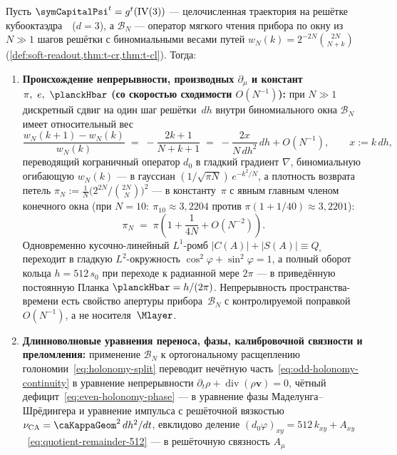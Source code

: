 \begin{theorem}
\label{thm:continuum-emergence-from-z}
\label{thm:continuum-emergence-ym-mass-gap}
Пусть $\symCapitalPsi^t = g^t(\mathrm{IV}(3))$ --- целочисленная траектория на решётке кубооктаэдра~\latGCKshort\ ($d=3$),
а $\mathcal{B}_N$ --- оператор мягкого чтения прибора по окну из $N\gg 1$ шагов решётки с биномиальными весами путей
$w_N(k) = 2^{-2N}\binom{2N}{N+k}$ (\cref{def:soft-readout,thm:t-cr,thm:t-cl}). Тогда:
\begin{enumerate}[label=(\roman*)]
\item \textbf{Происхождение непрерывности, производных $\partial_\mu$ и констант $\pi,\ e,\ \planckHbar$ (со скоростью сходимости $O(N^{-1})$):}
  при $N\gg 1$ дискретный сдвиг на один шаг решётки~$dh$ внутри биномиального окна $\mathcal{B}_N$ имеет относительный вес
  \[
    \frac{w_N(k+1) - w_N(k)}{w_N(k)} \;=\; -\frac{2k+1}{N+k+1} \;=\; -\frac{2x}{N\,dh^2}\,dh + O(N^{-1}),
    \qquad x := k\,dh,
  \]
  переводящий кограничный оператор $d_0$ в гладкий градиент $\nabla$, биномиальную огибающую $w_N(k)$ --- в гауссиан
  $(1/\sqrt{\pi N})\,e^{-k^2/N}$, а плотность возврата петель $\pi_N := \frac{1}{N}\bigl(2^{2N}/\binom{2N}{N}\bigr)^2$ --- в константу~$\pi$
  с явным главным членом конечного окна (при $N=10\colon\ \pi_{10}\approx 3{,}2204$ против $\pi(1+1/40)\approx 3{,}2201$):
  \[
    \pi_N \;=\; \pi\left(1 + \frac{1}{4N} + O(N^{-2})\right).
  \]
  Одновременно кусочно-линейный $L^1$-ромб $|C(A)|+|S(A)|\equiv Q_\square$ переходит в гладкую $L^2$-окружность $\cos^2\varphi + \sin^2\varphi = 1$,
  а полный оборот кольца $h = 512\,s_0$ при переходе к радианной мере $2\pi$ --- в приведённую постоянную Планка $\planckHbar = h/(2\pi)$.
  Непрерывность пространства-времени есть свойство апертуры прибора~$\mathcal{B}_N$ с контролируемой поправкой $O(N^{-1})$, а не носителя~$\Mlayer$.
\item \textbf{Длинноволновые уравнения переноса, фазы, калибровочной связности и преломления:}
  применение $\mathcal{B}_N$ к ортогональному расщеплению голономии~\eqref{eq:holonomy-split} переводит нечётную часть~\eqref{eq:odd-holonomy-continuity}
  в уравнение непрерывности $\partial_t\rho + \operatorname{div}(\rho\mathbf{v}) = 0$, чётный дефицит~\eqref{eq:even-holonomy-phase} ---
  в уравнение фазы Маделунга--Шрёдингера и уравнение импульса с решёточной вязкостью $\nu_{\mathrm{CA}} = \caKappaGeom^2\,dh^2/dt$,
  евклидово деление $(d_0\varphi)_{xy} = 512\,k_{xy} + A_{xy}$~\eqref{eq:quotient-remainder-512} --- в решёточную связность $A_\mu$

\end{enumerate}
\end{theorem}
